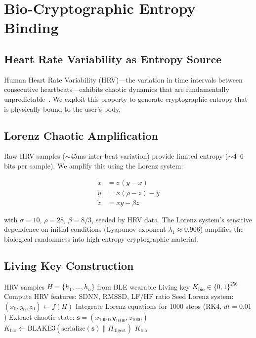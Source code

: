\documentclass[11pt,a4paper]{article}
\begin{document}
\section{Bio-Cryptographic Entropy Binding}
\label{sec:biocrypto}

\subsection{Heart Rate Variability as Entropy Source}

Human Heart Rate Variability (HRV)---the variation in time intervals
between consecutive heartbeats---exhibits chaotic dynamics that are
fundamentally unpredictable~\cite{goldberger2002}. We exploit this
property to generate cryptographic entropy that is physically bound to
the user's body.

\subsection{Lorenz Chaotic Amplification}

Raw HRV samples ($\sim$45ms inter-beat variation) provide limited entropy
($\sim$4--6 bits per sample). We amplify this using the Lorenz system:

\begin{align}
\dot{x} &= \sigma(y - x) \\
\dot{y} &= x(\rho - z) - y \\
\dot{z} &= xy - \beta z
\end{align}

with $\sigma = 10$, $\rho = 28$, $\beta = 8/3$, seeded by HRV data.
The Lorenz system's sensitive dependence on initial conditions (Lyapunov
exponent $\lambda_1 \approx 0.906$) amplifies the biological randomness
into high-entropy cryptographic material.

\subsection{Living Key Construction}

\begin{algorithm}[H]
\caption{Bio-Cryptographic Living Key}
\label{alg:biokey}
\begin{algorithmic}[1]
\Require HRV samples $H = \{h_1, \ldots, h_n\}$ from BLE wearable
\Ensure Living key $K_{\text{bio}} \in \{0,1\}^{256}$
\State Compute HRV features: SDNN, RMSSD, LF/HF ratio
\State Seed Lorenz system: $(x_0, y_0, z_0) \gets f(H)$
\State Integrate Lorenz equations for 1000 steps (RK4, $dt = 0.01$)
\State Extract chaotic state: $\mathbf{s} = (x_{1000}, y_{1000}, z_{1000})$
\State $K_{\text{bio}} \gets \text{BLAKE3}(\text{serialize}(\mathbf{s}) \| H_{\text{digest}})$
\State \Return $K_{\text{bio}}$
\end{algorithmic}
\end{algorithm}
\end{document}
